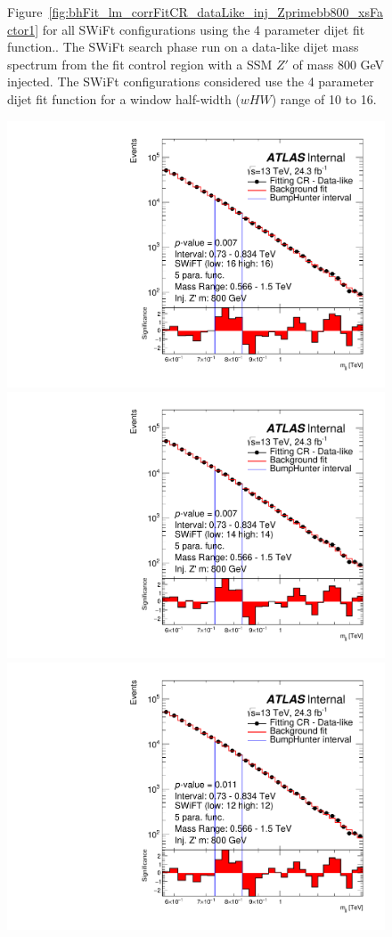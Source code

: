 \begin{figure}[!htb]
{}
\caption[Figure~\ref{fig:bhFit_lm_corrFitCR_dataLike_inj_Zprimebb800_xsFactor1} for all SWiFt configurations using the 4 parameter dijet fit function..]
{\label{fig:app-bhFit_lm_corrFitCR_dataLike_inj_Zprimebb800_xsFactor1_4para}
Figure~\ref{fig:bhFit_lm_corrFitCR_dataLike_inj_Zprimebb800_xsFactor1} for all SWiFt configurations using the 4 parameter dijet fit function..    
  The SWiFt search phase run on a data-like dijet mass spectrum
  from the fit control region with a SSM $Z'$ of mass 800 GeV injected.
  The SWiFt configurations considered use the 4 parameter dijet fit function for a window half-width ($wHW$) range of 10 to 16.
}
\end{figure}
\begin{figure}[!htb]
\captionsetup[subfigure]{aboveskip=0pt,justification=centering}
 {
  \includegraphics[width=0.48\linewidth, angle=0]{figs/Dibjet/LowMass/FitStudy_min566/bhFit_corrFitCR_dataLike_5para_low16_high16_inj_Zprimebb800_xsFactor1.pdf}
}
 {
  \includegraphics[width=0.48\linewidth, angle=0]{figs/Dibjet/LowMass/FitStudy_min566/bhFit_corrFitCR_dataLike_5para_low14_high14_inj_Zprimebb800_xsFactor1.pdf}
}
 {
  \includegraphics[width=0.48\linewidth, angle=0]{figs/Dibjet/LowMass/FitStudy_min566/bhFit_corrFitCR_dataLike_5para_low12_high12_inj_Zprimebb800_xsFactor1.pdf}
}
\end{figure}
